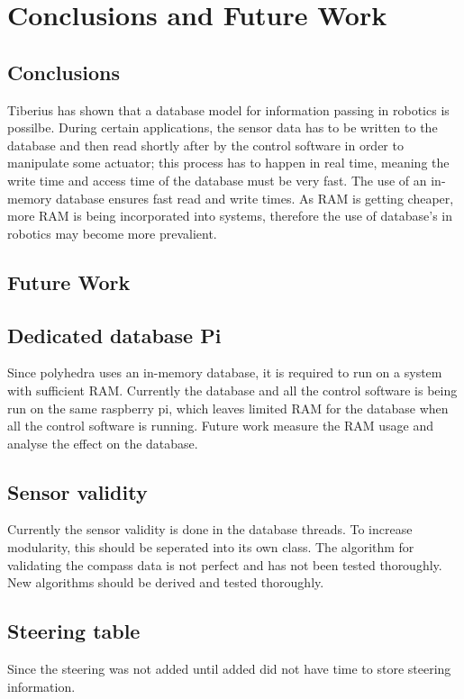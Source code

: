 \section{Conclusions and Future Work}
\subsection{Conclusions}
Tiberius has shown that a database model for information passing in robotics is possilbe. During certain applications, the sensor data has to be written to the database and then read shortly after by the control software in order to manipulate some actuator; this process has to happen in real time, meaning the write time and access time of the database must be very fast. The use of an in-memory database ensures fast read and write times. As RAM is getting cheaper, more RAM is being incorporated into systems, therefore the use of database's in robotics may become more prevalient.  

\subsection{Future Work}
\subsection{Dedicated database Pi}
Since polyhedra uses an in-memory database, it is required to run on a system with sufficient RAM. Currently the database and all the control software is being run on the same raspberry pi, which leaves limited RAM for the database when all the control software is running. Future work measure the RAM usage and analyse the effect on the database.

\subsection{Sensor validity}
Currently the sensor validity is done in the database threads. To increase modularity, this should be seperated into its own class. 
The algorithm for validating the compass data is not perfect and has not been tested thoroughly. New algorithms should be derived and tested thoroughly.

\subsection{Steering table}
Since the steering was not added until added did not have time to store steering information. 

